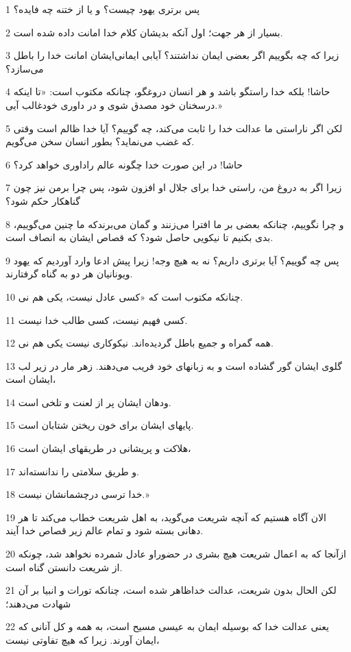 \par 1 پس برتری یهود چیست؟ و یا از ختنه چه فایده؟
\par 2 بسیار از هر جهت؛ اول آنکه بدیشان کلام خدا امانت داده شده است.
\par 3 زیرا که چه بگوییم اگر بعضی ایمان نداشتند؟ آیابی ایمانی‌ایشان امانت خدا را باطل می‌سازد؟
\par 4 حاشا! بلکه خدا راستگو باشد و هر انسان دروغگو، چنانکه مکتوب است: «تا اینکه درسخنان خود مصدق شوی و در داوری خودغالب آیی.»
\par 5 لکن اگر ناراستی ما عدالت خدا را ثابت می‌کند، چه گوییم؟ آیا خدا ظالم است وقتی که غضب می‌نماید؟ بطور انسان سخن می‌گویم.
\par 6 حاشا! در این صورت خدا چگونه عالم راداوری خواهد کرد؟
\par 7 زیرا اگر به دروغ من، راستی خدا برای جلال او افزون شود، پس چرا برمن نیز چون گناهکار حکم شود؟
\par 8 و چرا نگوییم، چنانکه بعضی بر ما افترا می‌زنند و گمان می‌برندکه ما چنین می‌گوییم، بدی بکنیم تا نیکویی حاصل شود؟ که قصاص ایشان به انصاف است.
\par 9 پس چه گوییم؟ آیا برتری داریم؟ نه به هیچ وجه! زیرا پیش ادعا وارد آوردیم که یهود ویونانیان هر دو به گناه گرفتارند.
\par 10 چنانکه مکتوب است که «کسی عادل نیست، یکی هم نی.
\par 11 کسی فهیم نیست، کسی طالب خدا نیست.
\par 12 همه گمراه و جمیع باطل گردیده‌اند. نیکوکاری نیست یکی هم نی.
\par 13 گلوی ایشان گور گشاده است و به زبانهای خود فریب می‌دهند. زهر مار در زیر لب ایشان است،
\par 14 ودهان ایشان پر از لعنت و تلخی است.
\par 15 پایهای ایشان برای خون ریختن شتابان است.
\par 16 هلاکت و پریشانی در طریقهای ایشان است،
\par 17 و طریق سلامتی را ندانسته‌اند.
\par 18 خدا ترسی درچشمانشان نیست.»
\par 19 الان آگاه هستیم که آنچه شریعت می‌گوید، به اهل شریعت خطاب می‌کند تا هر دهانی بسته شود و تمام عالم زیر قصاص خدا آیند.
\par 20 ازآنجا که به اعمال شریعت هیچ بشری در حضوراو عادل شمرده نخواهد شد، چونکه از شریعت دانستن گناه است.
\par 21 لکن الحال بدون شریعت، عدالت خداظاهر شده است، چنانکه تورات و انبیا بر آن شهادت می‌دهند؛
\par 22 یعنی عدالت خدا که بوسیله ایمان به عیسی مسیح است، به همه و کل آنانی که ایمان آورند. زیرا که هیچ تفاوتی نیست،
